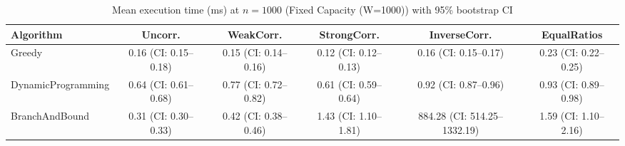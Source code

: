 \begin{table}[tb]
\centering
\caption{Mean execution time (ms) at $n=1000$ (Fixed Capacity (W=1000)) with 95\% bootstrap CI}
\label{tab:fixed-time-max-n}
\begin{tabular}{lccccc}
\toprule
Algorithm & Uncorr. & WeakCorr. & StrongCorr. & InverseCorr. & EqualRatios \\
\midrule
Greedy & 0.16 (CI: 0.15–0.18) & 0.15 (CI: 0.14–0.16) & 0.12 (CI: 0.12–0.13) & 0.16 (CI: 0.15–0.17) & 0.23 (CI: 0.22–0.25) \\
DynamicProgramming & 0.64 (CI: 0.61–0.68) & 0.77 (CI: 0.72–0.82) & 0.61 (CI: 0.59–0.64) & 0.92 (CI: 0.87–0.96) & 0.93 (CI: 0.89–0.98) \\
BranchAndBound & 0.31 (CI: 0.30–0.33) & 0.42 (CI: 0.38–0.46) & 1.43 (CI: 1.10–1.81) & 884.28 (CI: 514.25–1332.19) & 1.59 (CI: 1.10–2.16) \\
\bottomrule
\end{tabular}
\end{table}
